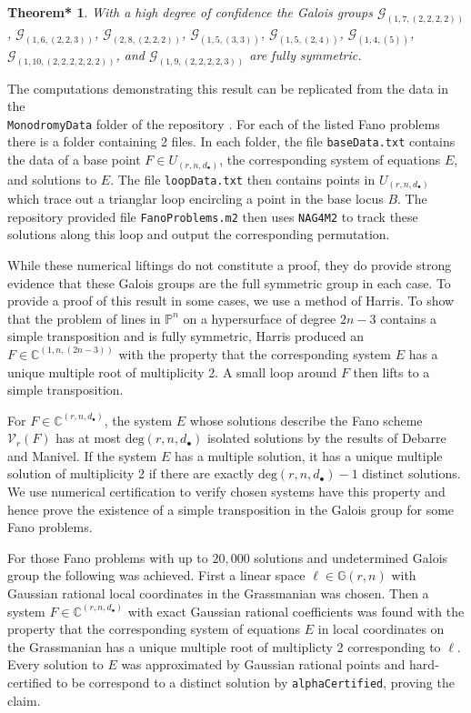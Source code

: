 \documentclass[12pt]{amsart}
\newtheorem{theorem'}{Theorem*}
\theoremstyle{definition}
\newcommand{\gr}{\mathbb{G}}
\newcommand{\gal}{\mathcal{G}}
\begin{document}
\begin{theorem'}
With a high degree of confidence the Galois groups $\gal_{(1,7,(2,2,2,2))}$, $\gal_{(1,6,(2,2,3))}$, $\gal_{(2,8,(2,2,2))}$, $\gal_{(1,5,(3,3))}$, $\gal_{(1,5,(2,4))}$, $\gal_{(1,4,(5))}$, $\gal_{(1,10,(2,2,2,2,2,2))}$, and $\gal_{(1,9,(2,2,2,2,3))}$ are fully symmetric.
\end{theorem'}

The computations demonstrating this result can be replicated from the data in the \\
\texttt{MonodromyData} folder of the repository \cite{GithubRepo}. For each of the listed Fano problems there is a folder containing 2 files. In each folder, the file \texttt{baseData.txt} contains the data of a base point $F\in U_{(r,n,d_\bullet)}$, the corresponding system of equations $E$, and solutions to $E$. The file \texttt{loopData.txt} then contains points in $U_{(r,n,d_\bullet)}$ which trace out a trianglar loop encircling a point in the base locus $B$. The repository provided file \texttt{FanoProblems.m2} then uses \texttt{NAG4M2} to track these solutions along this loop and output the corresponding permutation.



%
While these numerical liftings do not constitute a proof, they do provide strong evidence that these Galois groups are the full symmetric group in each case. To provide a proof of this result in some cases, we use a method of Harris. To show that the problem of lines in $\mathbb{P}^n$ on a hypersurface of degree $2n-3$ contains a simple transposition and is fully symmetric, Harris produced an $F\in \mathbb{C}^{(1,n,(2n-3))}$ with the property that the corresponding system $E$ has a unique multiple root of multiplicity 2. A small loop around $F$ then lifts to a simple transposition.

For $F\in \mathbb{C}^{(r,n,d_\bullet)}$, the system $E$ whose solutions describe the Fano scheme $\mathcal{V}_r(F)$ has at most $\text{deg}(r,n,d_\bullet)$ isolated solutions by the results of Debarre and Manivel. If the system $E$ has a multiple solution, it has a unique multiple solution of multiplicity 2 if there are exactly $\text{deg}(r,n,d_\bullet)-1$ distinct solutions. We use numerical certification to verify chosen systems have this property and hence prove the existence of a simple transposition in the Galois group for some Fano problems.

For those Fano problems with up to $20,000$ solutions and undetermined Galois group the following was achieved. First a linear space $\ell\in\gr(r,n)$ with Gaussian rational local coordinates in the Grassmanian was chosen. Then a system $F\in \mathbb{C}^{(r,n,d_\bullet)}$ with exact Gaussian rational coefficients was found with the property that the corresponding system of equations $E$ in local coordinates on the Grassmanian has a unique multiple root of multiplicty 2 corresponding to $\ell$. Every solution to $E$ was approximated by Gaussian rational points and hard-certified to be correspond to a distinct solution by \texttt{alphaCertified}, proving the claim. 
\end{document}
